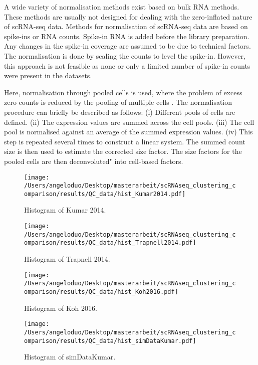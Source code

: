 \documentclass[11pt, a4paper]{article}\usepackage[]{graphicx}\usepackage[]{color}
\begin{document}
A wide variety of normalisation methods exist based on bulk RNA methods. These methods are usually not designed for dealing with the zero-inflated nature of scRNA-seq data\citet{lun2016pooling}. 
Methods for normalisation of scRNA-seq data are based on spike-ins or RNA counts. Spike-in RNA is added before the library preparation. Any changes in the spike-in coverage are assumed to be due to technical factors. The normalisation is done by scaling the counts to level the spike-in. However, this approach is not feasible as none or only a limited number of spike-in counts were present in the datasets.

Here, normalisation through pooled cells is used, where the problem of excess zero counts is reduced by the pooling of multiple cells \citet{lun2016pooling}. The normalisation procedure can briefly be described as follows: (i) Different pools of cells are defined. (ii) The expression values are summed across the cell pools. (iii) The cell pool is normalised against an average of the summed expression values. (iv) This step is repeated several times to construct a linear system. 
The summed count size is then used to estimate the corrected size factor. The size factors for the pooled cells are then deconvoluted" into cell-based factors. 



\begin{figure}[!h]
\texttt{[image: /Users/angeloduo/Desktop/masterarbeit/scRNAseq\_clustering\_comparison/results/QC\_data/hist\_Kumar2014.pdf]}
\caption{Histogram of Kumar 2014.}
\label{fig:histkumar}
\end{figure}

\begin{figure}[!h]
\texttt{[image: /Users/angeloduo/Desktop/masterarbeit/scRNAseq\_clustering\_comparison/results/QC\_data/hist\_Trapnell2014.pdf]}
\caption{Histogram of Trapnell 2014. }
\label{fig:histtrap}
\end{figure}

\begin{figure}[!h]
\texttt{[image: /Users/angeloduo/Desktop/masterarbeit/scRNAseq\_clustering\_comparison/results/QC\_data/hist\_Koh2016.pdf]}
\caption{Histogram of Koh 2016. }
\label{fig:histkoh}
\end{figure}


\begin{figure}[!h]
\texttt{[image: /Users/angeloduo/Desktop/masterarbeit/scRNAseq\_clustering\_comparison/results/QC\_data/hist\_simDataKumar.pdf]}
\caption{Histogram of simDataKumar. }
\label{fig:histsim}
\end{figure}
\end{document}
